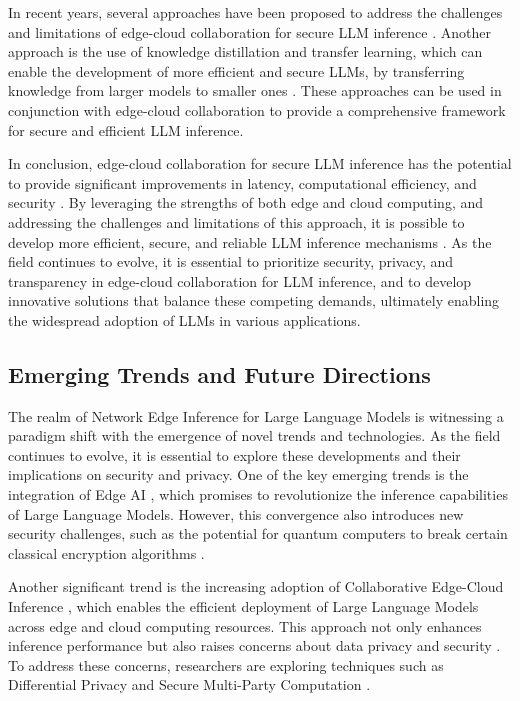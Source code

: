 \documentclass[11pt,a4paper]{article}
\begin{document}
In recent years, several approaches have been proposed to address the challenges and limitations of edge-cloud collaboration for secure LLM inference \cite{arxiv:2401.14112}. Another approach is the use of knowledge distillation and transfer learning, which can enable the development of more efficient and secure LLMs, by transferring knowledge from larger models to smaller ones \cite{arxiv:2502.01378}. These approaches can be used in conjunction with edge-cloud collaboration to provide a comprehensive framework for secure and efficient LLM inference.

In conclusion, edge-cloud collaboration for secure LLM inference has the potential to provide significant improvements in latency, computational efficiency, and security \cite{arxiv:2505.03031}. By leveraging the strengths of both edge and cloud computing, and addressing the challenges and limitations of this approach, it is possible to develop more efficient, secure, and reliable LLM inference mechanisms \cite{arxiv:2406.05955}. As the field continues to evolve, it is essential to prioritize security, privacy, and transparency in edge-cloud collaboration for LLM inference, and to develop innovative solutions that balance these competing demands, ultimately enabling the widespread adoption of LLMs in various applications.


\subsection{Emerging Trends and Future Directions}


The realm of Network Edge Inference for Large Language Models is witnessing a paradigm shift with the emergence of novel trends and technologies. As the field continues to evolve, it is essential to explore these developments and their implications on security and privacy. One of the key emerging trends is the integration of Edge AI \cite{doi:10.1109/mnet.2025.3539338}, which promises to revolutionize the inference capabilities of Large Language Models. However, this convergence also introduces new security challenges, such as the potential for quantum computers to break certain classical encryption algorithms \cite{doi:10.1109/comsnets53615.2022.9668515}.

Another significant trend is the increasing adoption of Collaborative Edge-Cloud Inference \cite{doi:10.3390/electronics12173598}, which enables the efficient deployment of Large Language Models across edge and cloud computing resources. This approach not only enhances inference performance but also raises concerns about data privacy and security \cite{arxiv:2502.11349}. To address these concerns, researchers are exploring techniques such as Differential Privacy \cite{doi:10.56127/ijst.v3i3.1958} and Secure Multi-Party Computation \cite{doi:10.1109/sp61157.2025.00182}.
\end{document}
